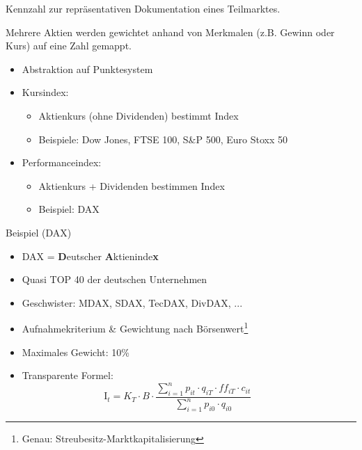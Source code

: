 \documentclass{beamer}
\begin{document}
			\begin{frame}
				\begin{definition}
					Kennzahl zur repräsentativen Dokumentation eines Teilmarktes.
				\end{definition}
				Mehrere Aktien werden gewichtet anhand von Merkmalen (z.B. Gewinn oder Kurs) auf eine Zahl gemappt.
			
				\begin{itemize}
					\item Abstraktion auf Punktesystem\pause
					\item Kursindex:
					\begin{itemize}
						\item Aktienkurs (ohne Dividenden) bestimmt Index
						\item Beispiele: Dow Jones, FTSE 100, S\&P 500, Euro Stoxx 50
					\end{itemize}\pause
					\item Performanceindex:
					\begin{itemize}
						\item Aktienkurs + Dividenden bestimmen Index
						\item Beispiel: DAX
					\end{itemize}
				\end{itemize}
			\end{frame}
		
			\begin{frame}{Beispiel (DAX)}
				\begin{itemize}
					\item DAX = \textbf{D}eutscher \textbf{A}ktieninde\textbf{x}\citewiki{DAX}
					\item Quasi TOP 40 der deutschen Unternehmen
					\item Geschwister: MDAX, SDAX, TecDAX, DivDAX, ...
					\item Aufnahmekriterium \& Gewichtung nach Börsenwert\footnote{Genau: Streubesitz-Marktkapitalisierung}
					\item Maximales Gewicht: 10\%
					\item Transparente Formel:\pause
					\[
						\text{I}_t = K_T \cdot B \cdot \frac
						{
							\sum_{i=1}^{n} p_{it} \cdot q_{iT} \cdot ff_{iT} \cdot c_{it}
						}
						{
							\sum_{i=1}^{n} p_{i0} \cdot q_{i0}
						}\hspace{1cm}
					\]
				\end{itemize}
			\end{frame}
		
\end{document}
